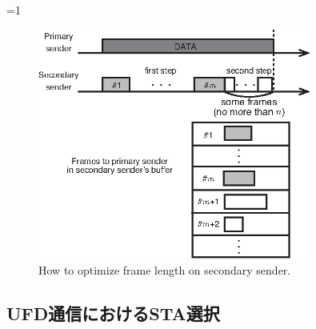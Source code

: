 \documentclass[master]{kuisthesis}		%
\newcounter{flagFig}
\begin{document}
		\ifnum\value{flagFig}=1 {\begin{figure}[htbp]
			\begin{center}
				\includegraphics[width=0.8\textwidth]{fig/opti.eps}
				\caption{How to optimize frame length on secondary sender.}
				\label{fig:opti}
			\end{center}
		\end{figure}}\fi

	\subsection{UFD通信におけるSTA選択}\label{sec:ufd_propose}
\end{document}
